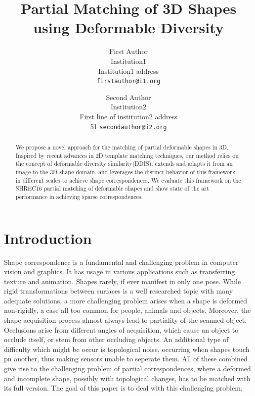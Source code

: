 \documentclass[10pt,twocolumn,letterpaper]{article}
\begin{document}
\title{Partial Matching of 3D Shapes using Deformable Diversity}

\author{First Author\\
Institution1\\
Institution1 address\\
{\tt\small firstauthor@i1.org}
\and
Second Author\\
Institution2\\
First line of institution2 address\\
51
{\tt\small secondauthor@i2.org}
}

\maketitle

\begin{abstract}
We propose a novel approach for the matching of partial deformable shapes in 3D. Inspired by recent advances in 2D template matching techniques, our method relies on the concept of deformable diversity similarity(DDIS), extends and adapts it from an image to the 3D shape domain, and leverages the distinct behavior of this framework in different scales to achieve shape correspondences. We evaluate this framework on the SHREC16 partial matching of deformable shapes and show state of the art performance in achieving sparse correspondences.
{\color{cyan}{\bf Currently done Section 3 \& 4}}
\end{abstract}

\section{Introduction}

Shape correspondence is a fundamental and challenging problem in computer vision and graphics. It has usage in various applications such as transferring texture and animation. 
Shapes rarely, if ever manifest in only one pose. While rigid transformations between surfaces is a well researched topic with many adequate solutions, a more challenging problem arises when a shape is deformed non-rigidly, a case all too common for people, animals and objects.
Moreover, the shape acquisition process almost always lead to partiality of the scanned object. Occlusions arise from different angles of acquisition, which cause an object to occlude itself, or stem from other occluding objects. 
An additional type of difficulty which might be occur is topological noise, occurring when shapes touch pn another, thus making  sensors unable to seperate them.
All of these combined give rise to the challenging problem of partial correspondences, where a deformed and incomplete shape, possibly with topological changes, has to be matched with its full version. The goal of this paper is to deal with this challenging problem.
\end{document}
